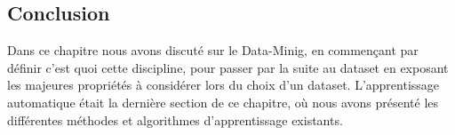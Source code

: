 \subsection{Conclusion}
Dans ce chapitre nous avons discuté sur le Data-Minig, en commençant par définir c'est quoi cette discipline, pour passer par la suite au dataset en exposant les majeures propriétés à considérer lors du choix d'un dataset. L'apprentissage automatique était la dernière section de ce chapitre, où nous avons présenté les différentes méthodes et algorithmes d'apprentissage existants. 